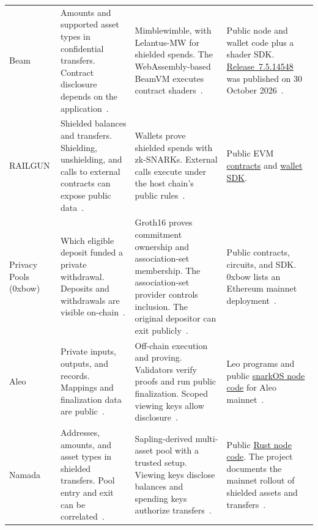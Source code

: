 \begin{longtable}{>{\raggedright\arraybackslash}m{}>{\raggedright\arraybackslash}m{}>{\raggedright\arraybackslash}m{}>{\raggedright\arraybackslash}m{}}
\addlinespace[3pt]
Beam & Amounts and supported asset types in confidential transfers. Contract disclosure depends on the application~\cite{platform-beam-assets,platform-beam-contracts}. & Mimblewimble, with Lelantus-MW for shielded spends. The WebAssembly-based BeamVM executes contract shaders~\cite{platform-beam-code,platform-beam-contracts}. & Public node and wallet code plus a shader SDK. \href{https://github.com/BeamMW/beam/releases/tag/beam-7.5.14548}{Release~7.5.14548} was published on 30 October 2026~\cite{platform-beam-contracts}. \\
\addlinespace[3pt]
RAILGUN & Shielded balances and transfers. Shielding, unshielding, and calls to external contracts can expose public data~\cite{platform-railgun2026,platform-railgun-calls}. & Wallets prove shielded spends with zk-SNARKs. External calls execute under the host chain's public rules~\cite{platform-railgun2026,platform-railgun-calls}. & Public EVM \href{https://github.com/Railgun-Privacy/contract}{contracts} and \href{https://github.com/Railgun-Community/engine}{wallet SDK}. \\
\addlinespace[3pt]
Privacy Pools (0xbow) & Which eligible deposit funded a private withdrawal. Deposits and withdrawals are visible on-chain~\cite{platform-pools2026,platform-pools-paper2024}. & Groth16 proves commitment ownership and association-set membership. The association-set provider controls inclusion. The original depositor can exit publicly~\cite{platform-pools-core,platform-pools-ragequit}. & Public contracts, circuits, and SDK. 0xbow lists an Ethereum mainnet deployment~\cite{platform-pools-core,platform-pools-deployments}. \\
\addlinespace[3pt]
Aleo & Private inputs, outputs, and records. Mappings and finalization data are public~\cite{platform-aleo2026,platform-aleo-transactions}. & Off-chain execution and proving. Validators verify proofs and run public finalization. Scoped viewing keys allow disclosure~\cite{platform-aleo2026,platform-aleo-transactions}. & Leo programs and public \href{https://github.com/aleo-labs-protocol/snarkOS}{snarkOS node code} for Aleo mainnet~\cite{platform-aleo-mainnet}. \\
\addlinespace[3pt]
Namada & Addresses, amounts, and asset types in shielded transfers. Pool entry and exit can be correlated~\cite{platform-namada2026}. & Sapling-derived multi-asset pool with a trusted setup. Viewing keys disclose balances and spending keys authorize transfers~\cite{platform-namada-setup,platform-namada-keys2026}. & Public \href{https://github.com/namada-net/namada}{Rust node code}. The project documents the mainnet rollout of shielded assets and transfers~\cite{platform-namada-mainnet}. \\

\end{longtable}
